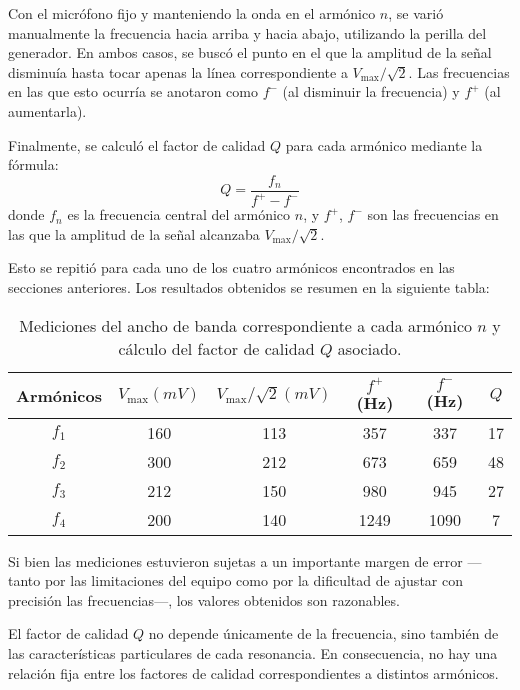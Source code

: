 \documentclass[12pt, a4paper]{article}
\begin{document}
Con el micrófono fijo y manteniendo la onda en el armónico $n$, se varió manualmente la frecuencia hacia arriba y hacia abajo, utilizando la perilla del generador. En ambos casos, se buscó el punto en el que la amplitud de la señal disminuía hasta tocar apenas la línea correspondiente a $V_\mathrm{max}/\sqrt{2}$. Las frecuencias en las que esto ocurría se anotaron como $f^-$ (al disminuir la frecuencia) y $f^+$ (al aumentarla).

Finalmente, se calculó el factor de calidad $Q$ para cada armónico mediante la fórmula:
$$Q = \frac{f_n}{f^+ - f^-}$$
donde $f_n$ es la frecuencia central del armónico $n$, y $f^+$, $f^-$ son las frecuencias en las que la amplitud de la señal alcanzaba $V_\mathrm{max}/\sqrt{2}$.

Esto se repitió para cada uno de los cuatro armónicos encontrados en las secciones anteriores. Los resultados obtenidos se resumen en la siguiente tabla:

\begin{table}[H]
    \centering
    \begin{tabular}{|c|c|c|c|c|c|}
    \hline
    \multirow{1}{2.1cm}{\centering Armónicos} 
        & $V_\mathrm{max} (mV)$
        & $V_\mathrm{max}/\sqrt{2} (mV)$ 
        & $f^+$ (Hz) 
        & $f^-$ (Hz)
        & $Q$ \\
    \hline
    $f_1$  & 160 & 113 & 357 & 337 & 17\\ \hline
    $f_2$  & 300 & 212 & 673 & 659 & 48\\ \hline
    $f_3$  & 212  & 150 & 980 & 945 & 27\\ \hline
    $f_4$  & 200  & 140 & 1249 & 1090 & 7\\ \hline
    \end{tabular}
    \caption{\centering Mediciones del ancho de banda correspondiente a cada armónico $n$ y cálculo del factor de calidad $Q$ asociado.}
    \label{tabla3}
\end{table}

Si bien las mediciones estuvieron sujetas a un importante margen de error —tanto por las limitaciones del equipo como por la dificultad de ajustar con precisión las frecuencias—, los valores obtenidos son razonables. 

El factor de calidad $Q$ no depende únicamente de la frecuencia, sino también de las características particulares de cada resonancia. En consecuencia, no hay una relación fija entre los factores de calidad correspondientes a distintos armónicos.
\end{document}
